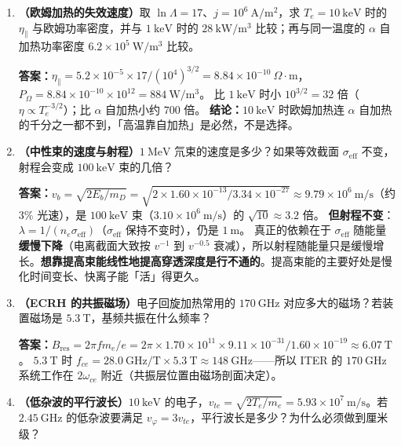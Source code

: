 \begin{enumerate}[leftmargin=1.6em,itemsep=2pt]

\item \textbf{（欧姆加热的失效速度）}取 $\ln\Lambda=17$、$j=10^6\ \mathrm{A/m^2}$，求 $T_e=10\ \mathrm{keV}$ 时的 $\eta_\parallel$ 与欧姆功率密度，并与 $1\ \mathrm{keV}$ 时的 $28\ \mathrm{kW/m^3}$ 比较；再与同一温度的 $\alpha$ 自加热功率密度 $6.2\times10^{5}\ \mathrm{W/m^3}$ 比较。

\textbf{答案：}$\eta_\parallel=5.2\times10^{-5}\times17/(10^4)^{3/2}=8.84\times10^{-10}\ \Omega\cdot\mathrm{m}$，
$P_\Omega=8.84\times10^{-10}\times10^{12}=884\ \mathrm{W/m^3}$。
比 $1\ \mathrm{keV}$ 时小 $10^{3/2}=32$ 倍（$\eta\propto T_e^{-3/2}$）；比 $\alpha$ 自加热小约 $700$ 倍。
\textbf{结论：}$10\ \mathrm{keV}$ 时欧姆加热连 $\alpha$ 自加热的千分之一都不到，「高温靠自加热」是必然，不是选择。

\item \textbf{（中性束的速度与射程）}$1\ \mathrm{MeV}$ 氘束的速度是多少？如果等效截面 $\sigma_{\mathrm{eff}}$ 不变，射程会变成 $100\ \mathrm{keV}$ 束的几倍？

\textbf{答案：}$v_b=\sqrt{2E_b/m_D}=\sqrt{2\times1.60\times10^{-13}/3.34\times10^{-27}}\approx9.79\times10^{6}\ \mathrm{m/s}$（约 $3\%$ 光速），是 $100\ \mathrm{keV}$ 束（$3.10\times10^{6}\ \mathrm{m/s}$）的 $\sqrt{10}\approx3.2$ 倍。
\textbf{但射程不变}：$\lambda=1/(n_e\sigma_{\mathrm{eff}})$（$\sigma_{\mathrm{eff}}$ 保持不变时），仍是 $1\ \mathrm{m}$。
真正的依赖在于 $\sigma_{\mathrm{eff}}$ 随能量\textbf{缓慢下降}（电离截面大致按 $v^{-1}$ 到 $v^{-0.5}$ 衰减），所以射程随能量只是缓慢增长。\textbf{想靠提高束能线性地提高穿透深度是行不通的}。提高束能的主要好处是慢化时间变长、快离子能「活」得更久。

\item \textbf{（ECRH 的共振磁场）}电子回旋加热常用的 $170\ \mathrm{GHz}$ 对应多大的磁场？若装置磁场是 $5.3\ \mathrm{T}$，基频共振在什么频率？

\textbf{答案：}$B_{\mathrm{res}}=2\pi f m_e/e=2\pi\times1.70\times10^{11}\times9.11\times10^{-31}/1.60\times10^{-19}\approx6.07\ \mathrm{T}$。
$5.3\ \mathrm{T}$ 时 $f_{ce}=28.0\ \mathrm{GHz/T}\times5.3\ \mathrm{T}\approx148\ \mathrm{GHz}$——所以 ITER 的 $170\ \mathrm{GHz}$ 系统工作在 $2\omega_{ce}$ 附近（共振层位置由磁场剖面决定）。

\item \textbf{（低杂波的平行波长）}$10\ \mathrm{keV}$ 的电子，$v_{te}=\sqrt{2T_e/m_e}=5.93\times10^{7}\ \mathrm{m/s}$。若 $2.45\ \mathrm{GHz}$ 的低杂波要满足 $v_\varphi=3v_{te}$，平行波长是多少？为什么必须做到厘米级？


\end{enumerate}
